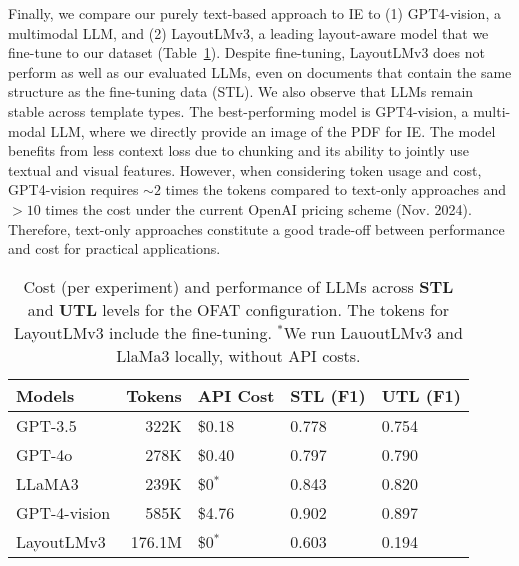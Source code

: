 

Finally, we compare our purely text-based approach to IE to (1) GPT4-vision, a multimodal LLM, and (2) LayoutLMv3, a leading layout-aware model that we fine-tune to our dataset (Table~\ref{tab:model_comparison}).
Despite fine-tuning, LayoutLMv3 does not perform as well as our evaluated LLMs, even on documents that contain the same structure as the fine-tuning data (STL). We also observe that LLMs remain stable across template types. The best-performing model is GPT4-vision, a multi-modal LLM, where we directly provide an image of the PDF for IE. The model benefits from less context loss due to chunking and its ability to jointly use textual and visual features. However, when considering token usage and cost, GPT4-vision requires $\sim2$ times the tokens compared to text-only approaches and $>10$ times the cost under the current OpenAI pricing scheme (Nov. 2024). Therefore, text-only approaches constitute a good trade-off between performance and cost for practical applications.

\begin{table}[h]
    \centering %
    \footnotesize %
    \caption{Cost (per experiment) and performance of LLMs across \textbf{STL} and \textbf{UTL} levels for the OFAT configuration. The tokens for LayoutLMv3 include the fine-tuning. $^*$We run LauoutLMv3 and LlaMa3 locally, without API costs. } 
    \label{tab:model_comparison}
    \setlength{\tabcolsep}{3pt}
    \begin{tabular}{l r l l l}
    \toprule
    \textbf{Models} & \textbf{Tokens} & \textbf{API Cost} & \textbf{STL (F1)} & \textbf{UTL (F1)} \\
    \midrule
    GPT-3.5                          & 322K  & \$0.18  & 0.778  & 0.754  \\ 
    GPT-4o                           & 278K  & \$0.40  & 0.797  & 0.790  \\
    LLaMA3                           & 239K  & \$0$^*$      & 0.843  & 0.820  \\
    GPT-4-vision                     & 585K  & \$4.76   & 0.902  & 0.897  \\
    LayoutLMv3                       & 176.1M  & \$0$^*$      & 0.603  & 0.194  \\
    \bottomrule
    \end{tabular}
    \rmspace
\end{table}



    








